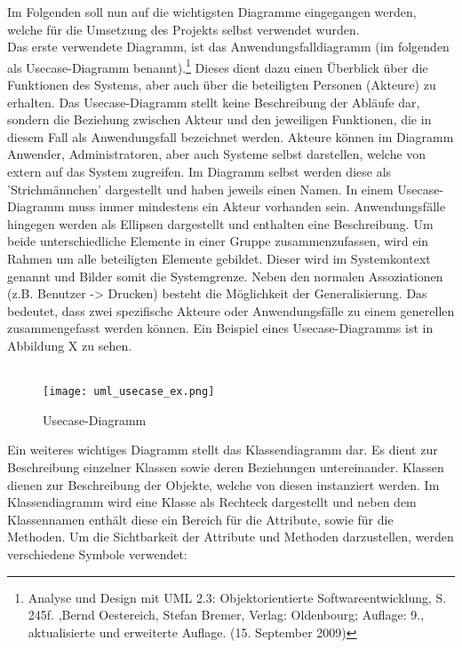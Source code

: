 Im Folgenden soll nun auf die wichtigsten Diagramme eingegangen werden, welche für die Umsetzung des Projekts selbst verwendet wurden.\\
Das erste verwendete Diagramm, ist das Anwendungsfalldiagramm (im folgenden als Usecase-Diagramm benannt).\footnote{Analyse und Design mit UML 2.3: Objektorientierte Softwareentwicklung, S. 245f. ,Bernd Oestereich, Stefan Bremer, Verlag: Oldenbourg; Auflage: 9., aktualisierte und erweiterte Auflage. (15. September 2009)} 
Dieses dient dazu einen Überblick über die Funktionen des Systems, aber auch über die beteiligten Personen (Akteure) zu erhalten. Das Usecase-Diagramm stellt keine Beschreibung der Abläufe dar, sondern die Beziehung zwischen Akteur und den jeweiligen Funktionen, die in diesem Fall als Anwendungsfall bezeichnet werden. Akteure können im Diagramm Anwender, Administratoren, aber auch Systeme selbst darstellen, welche von extern auf das System zugreifen. Im Diagramm selbst werden diese als 'Strichmännchen' dargestellt und haben jeweils einen Namen. In einem Usecase-Diagramm muss immer mindestens ein Akteur vorhanden sein.
Anwendungsfälle hingegen werden als Ellipsen dargestellt und enthalten eine Beschreibung.
Um beide unterschiedliche Elemente in einer Gruppe zusammenzufassen, wird ein Rahmen um alle beteiligten Elemente gebildet.
Dieser wird im Systemkontext genannt und Bilder somit die Systemgrenze.
Neben den normalen Assoziationen (z.B. Benutzer -> Drucken) besteht die Möglichkeit der Generalisierung.
Das bedeutet, dass zwei spezifische Akteure oder Anwendungsfälle zu einem generellen zusammengefasst werden können.
Ein Beispiel eines Usecase-Diagramms ist in Abbildung X zu sehen.\\
\\
\begin{figure}[H]
\centering
\texttt{[image: uml\_usecase\_ex.png]}
\caption{Usecase-Diagramm}
\label{fig:show_s1_s2_p1_n1}
\end{figure}
Ein weiteres wichtiges Diagramm stellt das Klassendiagramm dar. Es dient zur Beschreibung einzelner Klassen sowie deren Beziehungen untereinander. Klassen dienen zur Beschreibung der Objekte, welche von diesen instanziert werden. Im Klassendiagramm wird eine Klasse als Rechteck dargestellt und neben dem Klassennamen enthält diese ein Bereich für die Attribute, sowie für die Methoden.
Um die Sichtbarkeit der Attribute und Methoden darzustellen, werden verschiedene Symbole verwendet:\\

